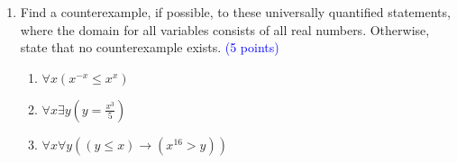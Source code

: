 \documentclass{article}
\newcommand{\pt}[1]{\textcolor{blue}{(#1 points)}}
\begin{document}
\begin{enumerate}
    \item{Find a counterexample, if possible, to these universally quantified statements, where the domain for all variables consists of all real numbers. Otherwise, state that no counterexample exists. \pt{5}}
    \begin{enumerate}
        \item $\forall x (x^{-x} \leq x^x)$\\
        \item $\forall x \exists y (y = \frac{x^3}{5})$ \\
        \item $\forall x \forall y  ((y \leq x) \to (x^{16} > y))$
    \end{enumerate}
\end{enumerate}
\end{document}
